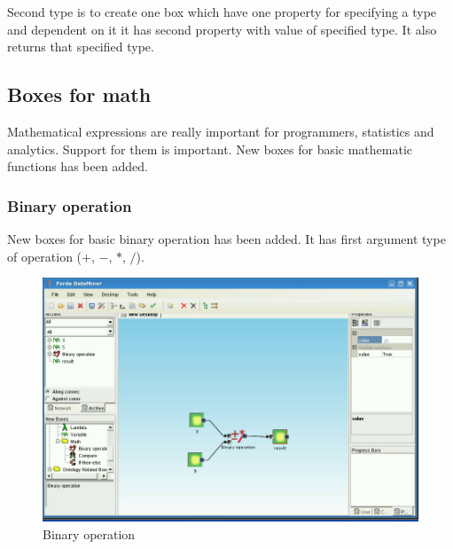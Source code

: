 \documentclass[a4paper,12pt]{book}
\begin{document}
Second type is to create one box which have one property for specifying a type and dependent on it it has second property with value of specified type. It also returns that specified type.

\subsection{Boxes for math}
Mathematical expressions are really important for programmers, statistics and analytics. Support for them is important. New boxes for basic mathematic functions has been added. 

\subsubsection{Binary operation}
New boxes for basic binary operation has been added. It has first argument type of operation ($+$, $-$, $*$, $/$).
\begin{figure}
	\includegraphics[width=13.72cm]{binaryOperation2.png}
	\caption{Binary operation}
\end{figure}
\end{document}
